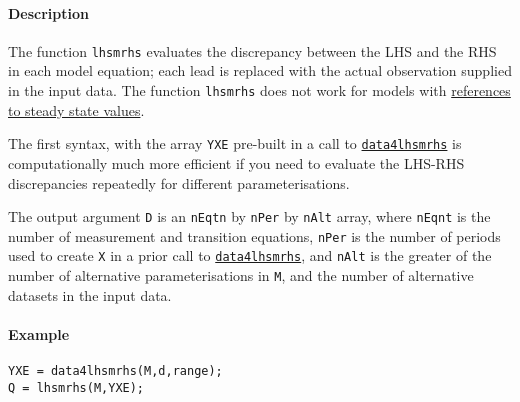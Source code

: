 \paragraph{Description}

The function \texttt{lhsmrhs} evaluates the discrepancy between the LHS
and the RHS in each model equation; each lead is replaced with the
actual observation supplied in the input data. The function
\texttt{lhsmrhs} does not work for models with
\href{modellang/sstateref}{references to steady state values}.

The first syntax, with the array \texttt{YXE} pre-built in a call to
\href{model/data4lhsmrhs}{\texttt{data4lhsmrhs}} is computationally much
more efficient if you need to evaluate the LHS-RHS discrepancies
repeatedly for different parameterisations.

The output argument \texttt{D} is an \texttt{nEqtn} by \texttt{nPer} by
\texttt{nAlt} array, where \texttt{nEqnt} is the number of measurement
and transition equations, \texttt{nPer} is the number of periods used to
create \texttt{X} in a prior call to
\href{model/data4lhsmrhs}{\texttt{data4lhsmrhs}}, and \texttt{nAlt} is
the greater of the number of alternative parameterisations in
\texttt{M}, and the number of alternative datasets in the input data.

\paragraph{Example}

\begin{verbatim}
YXE = data4lhsmrhs(M,d,range);
Q = lhsmrhs(M,YXE);
\end{verbatim}


